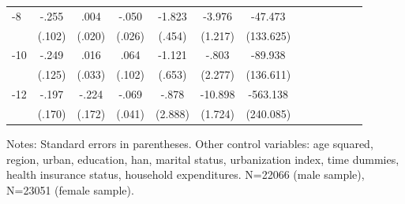 \begin{table}[h]
\begin{adjustbox}{max width=\linewidth}
\begin{threeparttable}
{\begin{tabular}{l*{6}{SS}}
-8             &    -.255\sym{*}  &     .004         &    -.050         &   -1.823\sym{***}&   -3.976\sym{**} &  -47.473         \\
                &   (.102)         &   (.020)         &   (.026)         &   (.454)         &  (1.217)         &(133.625)         \\
-10            &    -.249\sym{*}  &     .016         &     .064         &   -1.121         &    -.803         &  -89.938         \\
                &   (.125)         &   (.033)         &   (.102)         &   (.653)         &  (2.277)         &(136.611)         \\
-12           &    -.197         &    -.224         &    -.069         &    -.878         &  -10.898\sym{***}& -563.138\sym{*}  \\
                &   (.170)         &   (.172)         &   (.041)         &  (2.888)         &  (1.724)         &(240.085)         \\      
\bottomrule
\end{tabular}
\begin{tablenotes}
\item Notes:   Standard errors in parentheses.
Other control variables: age squared, region, urban, education, han, marital status, urbanization index, time dummies, health insurance status, household expenditures. N=22066 (male sample), N=23051 (female sample).
\end{tablenotes}
}
\end{threeparttable}
\end{adjustbox}
\end{table}



